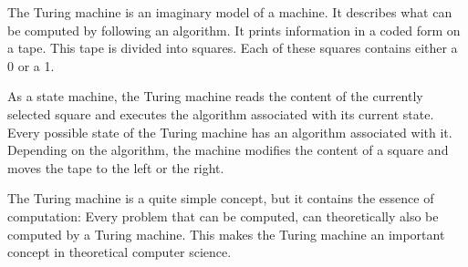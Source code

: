 
The Turing machine is an imaginary model of a machine. It describes what can be computed by following an algorithm. It prints information in a coded form on a tape. This tape is divided into squares. Each of these squares contains either a 0 or a 1.

As a state machine, the Turing machine reads the content of the currently selected square and executes the algorithm associated with its current state. Every possible state of the Turing machine has an algorithm associated with it. Depending on the algorithm, the machine modifies the content of a square and moves the tape to the left or the right.

The Turing machine is a quite simple concept, but it contains the essence of computation: Every problem that can be computed, can theoretically also be computed by a Turing machine. This makes the Turing machine an important concept in theoretical computer science.

